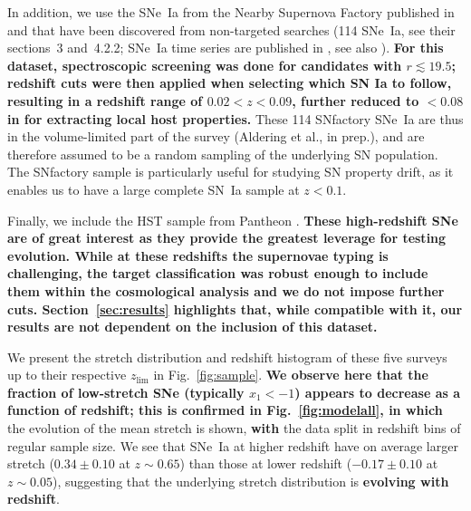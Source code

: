\documentclass[referee]{aa}
\begin{document}
In addition, we use the SNe~Ia from the Nearby Supernova Factory
\citep[SNfactory,][]{aldering2002} published in \cite{rigault2020} and that have
been discovered from non-targeted searches (114 SNe~Ia, see their sections~3
and~4.2.2; SNe~Ia time series are published in \citealt{saunders2020}, see also
\citealt{aldering2020}). \textbf{For this dataset, spectroscopic screening was
    done for candidates with $r \lesssim 19.5$; redshift cuts were then applied
    when selecting which SN Ia to follow, resulting in a redshift range of $0.02
< z < 0.09$, further reduced to $<0.08$ in \cite{rigault2020} for extracting
local host properties.} These 114 SNfactory SNe~Ia are thus in the
volume-limited part of the survey (Aldering et al., in prep.), and are therefore
assumed to be a random sampling of the underlying SN population. The SNfactory
sample is particularly useful for studying SN property drift, as it enables us
to have a large complete SN~Ia sample at $z<0.1$. 

Finally, we include the HST sample from Pantheon \citep{strolger04}.
\textbf{These high-redshift SNe are of great interest as they provide the
    greatest leverage for testing evolution. While at these redshifts the
    supernovae typing is challenging, the target classification was robust
    enough to include them within the cosmological analysis \citep{scolnic2018a}
    and we do not impose further cuts. Section~\ref{sec:results} highlights
    that, while compatible with it, our results are not dependent on the
    inclusion of this dataset.}

We present the stretch distribution and redshift histogram of these five surveys
up to their respective $z_{\lim}$ in Fig.~\ref{fig:sample}. \textbf{We observe here
that the fraction of low-stretch SNe (typically $x_1 < -1$) appears to decrease as
a function of redshift; this is confirmed in Fig.~\ref{fig:modelall}, in which}
the evolution of the mean stretch is shown, \textbf{with} the data split in
redshift bins of regular sample size. We see that SNe~Ia at higher redshift have
on average larger stretch ($0.34 \pm 0.10$ at $z\sim0.65$) than those at lower
redshift ($-0.17\pm 0.10$ at $z\sim0.05$), suggesting that the underlying
stretch distribution is \textbf{evolving with redshift}.
\end{document}
